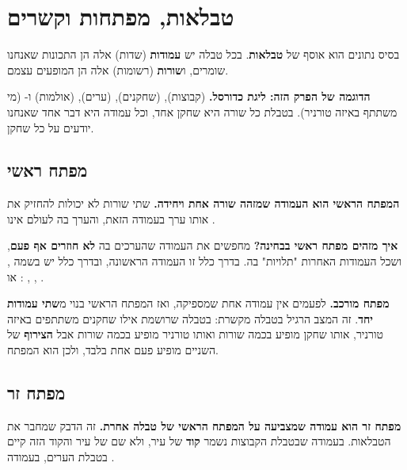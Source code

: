 \documentclass[11pt,a4paper]{article}
\begin{document}
\vspace{10pt}
\section{טבלאות, מפתחות וקשרים}

בסיס נתונים הוא אוסף של \textbf{טבלאות}. בכל טבלה יש \textbf{עמודות} (שדות) \textendash{} אלה הן התכונות שאנחנו שומרים, ו\textbf{שורות} (רשומות) \textendash{} אלה הן המופעים עצמם.

\vspace{2pt}
\begin{panel}
\textbf{הדוגמה של הפרק הזה: ליגת כדורסל.}  (קבוצות),  (שחקנים),  (ערים),  (אולמות) ו- (מי משתתף באיזה טורניר). בטבלת  כל שורה היא שחקן אחד, וכל עמודה היא דבר אחד שאנחנו יודעים על כל שחקן.
\end{panel}

\subsection{מפתח ראשי }

\textbf{המפתח הראשי הוא העמודה שמזהה שורה אחת ויחידה.} שתי שורות לא יכולות להחזיק את אותו ערך בעמודה הזאת, והערך בה לעולם אינו .

\begin{panel}
\textbf{איך מזהים מפתח ראשי בבחינה?} מחפשים את העמודה שהערכים בה \textbf{לא חוזרים אף פעם}, ושכל העמודות האחרות "תלויות" בה. בדרך כלל זו העמודה הראשונה, ובדרך כלל יש בשמה ,  או : , , .

\vspace{3pt}
\textbf{מפתח מורכב.} לפעמים אין עמודה אחת שמספיקה, ואז המפתח הראשי בנוי מ\textbf{שתי עמודות יחד}. זה המצב הרגיל בטבלה מקשרת: בטבלה שרושמת אילו שחקנים משתתפים באיזה טורניר, אותו שחקן מופיע בכמה שורות ואותו טורניר מופיע בכמה שורות \textendash{} אבל \textbf{הצירוף} של השניים מופיע פעם אחת בלבד, ולכן הוא המפתח.
\end{panel}

\subsection{מפתח זר }

\textbf{מפתח זר הוא עמודה שמצביעה על המפתח הראשי של טבלה אחרת.} זה הדבק שמחבר את הטבלאות. בעמודה  שבטבלת הקבוצות נשמר \textbf{קוד} של עיר, ולא שם של עיר \textendash{} והקוד הזה קיים בטבלת הערים, בעמודה .
\end{document}

